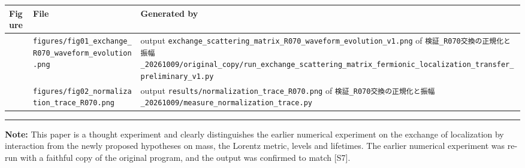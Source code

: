 \documentclass[
  a4paper,
]{article}
\newcounter{none} %
\begin{document}
{\def\LTcaptype{none} %
\begin{longtable}[]{@{}
  >{\raggedright\arraybackslash}p{}
  >{\raggedright\arraybackslash}p{}
  >{\raggedright\arraybackslash}p{}@{}}
\toprule\noalign{}
\begin{minipage}[b]{\linewidth}\raggedright
Figure
\end{minipage} & \begin{minipage}[b]{\linewidth}\raggedright
File
\end{minipage} & \begin{minipage}[b]{\linewidth}\raggedright
Generated by
\end{minipage} \\
\midrule\noalign{}
\endhead
\bottomrule\noalign{}
\endlastfoot
1 & \texttt{figures/\allowbreak{}fig01\_\allowbreak{}exchange\_\allowbreak{}R070\_\allowbreak{}waveform\_\allowbreak{}evolution.png} &
output
\texttt{exchange\_\allowbreak{}scattering\_\allowbreak{}matrix\_\allowbreak{}R070\_\allowbreak{}waveform\_\allowbreak{}evolution\_\allowbreak{}v1.png}
of
\texttt{検証\_\allowbreak{}R070交換の正規化と振幅\_\allowbreak{}20261009/\allowbreak{}original\_\allowbreak{}copy/\allowbreak{}run\_\allowbreak{}exchange\_\allowbreak{}scattering\_\allowbreak{}matrix\_\allowbreak{}fermionic\_\allowbreak{}localization\_\allowbreak{}transfer\_\allowbreak{}preliminary\_\allowbreak{}v1.py} \\
2 & \texttt{figures/\allowbreak{}fig02\_\allowbreak{}normalization\_\allowbreak{}trace\_\allowbreak{}R070.png} & output
\texttt{results/\allowbreak{}normalization\_\allowbreak{}trace\_\allowbreak{}R070.png} of
\texttt{検証\_\allowbreak{}R070交換の正規化と振幅\_\allowbreak{}20261009/\allowbreak{}measure\_\allowbreak{}normalization\_\allowbreak{}trace.py} \\
\end{longtable}
}

\begin{center}\rule{0.5\linewidth}{0.5pt}\end{center}

\textbf{Note:} This paper is a thought experiment and clearly
distinguishes the earlier numerical experiment on the exchange of
localization by interaction from the newly proposed hypotheses on mass,
the Lorentz metric, levels and lifetimes. The earlier numerical
experiment was re-run with a faithful copy of the original program, and
the output was confirmed to match {[}S7{]}.
\end{document}

